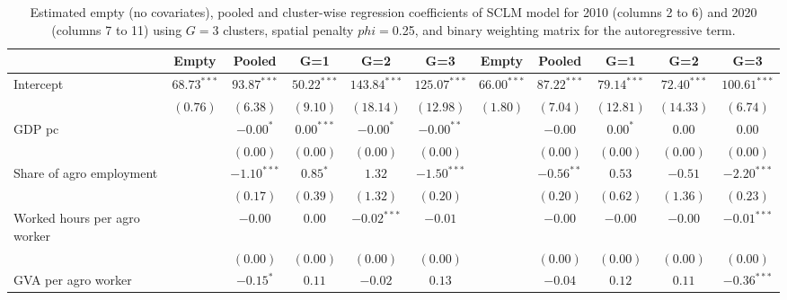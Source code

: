 
\begin{table}
\caption{Estimated empty (no covariates), pooled and cluster-wise regression coefficients of SCLM model for 2010 (columns 2 to 6) and 2020 (columns 7 to 11) using $G=$3 clusters, spatial penalty $phi=$0.25, and binary weighting matrix for the autoregressive term.}
\begin{center}
\begin{tabular}{l c c c c c c c c c c}
\hline
 & Empty & Pooled & G=1 & G=2 & G=3 & Empty & Pooled & G=1 & G=2 & G=3 \\
\hline
Intercept                         & $68.73^{***}$ & $93.87^{***}$ & $50.22^{***}$ & $143.84^{***}$ & $125.07^{***}$ & $66.00^{***}$ & $87.22^{***}$ & $79.14^{***}$ & $72.40^{***}$ & $100.61^{***}$ \\
                                  & $(0.76)$      & $(6.38)$      & $(9.10)$      & $(18.14)$      & $(12.98)$      & $(1.80)$      & $(7.04)$      & $(12.81)$     & $(14.33)$     & $(6.74)$       \\
GDP pc                            &               & $-0.00^{*}$   & $0.00^{***}$  & $-0.00^{*}$    & $-0.00^{**}$   &               & $-0.00$       & $0.00^{*}$    & $0.00$        & $0.00$         \\
                                  &               & $(0.00)$      & $(0.00)$      & $(0.00)$       & $(0.00)$       &               & $(0.00)$      & $(0.00)$      & $(0.00)$      & $(0.00)$       \\
Share of agro employment          &               & $-1.10^{***}$ & $0.85^{*}$    & $1.32$         & $-1.50^{***}$  &               & $-0.56^{**}$  & $0.53$        & $-0.51$       & $-2.20^{***}$  \\
                                  &               & $(0.17)$      & $(0.39)$      & $(1.32)$       & $(0.20)$       &               & $(0.20)$      & $(0.62)$      & $(1.36)$      & $(0.23)$       \\
Worked hours per agro worker      &               & $-0.00$       & $0.00$        & $-0.02^{***}$  & $-0.01$        &               & $-0.00$       & $-0.00$       & $-0.00$       & $-0.01^{***}$  \\
                                  &               & $(0.00)$      & $(0.00)$      & $(0.00)$       & $(0.00)$       &               & $(0.00)$      & $(0.00)$      & $(0.00)$      & $(0.00)$       \\
GVA per agro worker               &               & $-0.15^{*}$   & $0.11$        & $-0.02$        & $0.13$         &               & $-0.04$       & $0.12$        & $0.11$        & $-0.36^{***}$  \\

\end{tabular}
\end{center}
\end{table}
